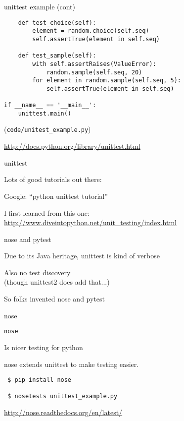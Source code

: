 \documentclass{beamer}
\begin{document}
\begin{frame}[fragile]{unittest example (cont)}

{\small
\begin{verbatim}
    def test_choice(self):
        element = random.choice(self.seq)
        self.assertTrue(element in self.seq)

    def test_sample(self):
        with self.assertRaises(ValueError):
            random.sample(self.seq, 20)
        for element in random.sample(self.seq, 5):
            self.assertTrue(element in self.seq)

if __name__ == '__main__':
    unittest.main()
\end{verbatim}
}

\vfill
(\verb|code/unitest_example.py|)

\vfill
\url{http://docs.python.org/library/unittest.html}

\end{frame} 

\begin{frame}[fragile]{unittest}

{\Large Lots of good tutorials out there:}

\vfill
{\Large Google: ``python unittest tutorial''}

\vfill
{\Large I first learned from this one:}\\[0.1in]
\url{http://www.diveintopython.net/unit_testing/index.html}

\end{frame} 

\begin{frame}[fragile]{nose and pytest}

{\Large Due to its Java heritage, unittest is kind of verbose}

\vfill
{\Large Also no test discovery}\\
\hspace{0.2in}(though unittest2 does add that...)

\vfill
{\Large So folks invented nose and pytest}

\end{frame} 

\begin{frame}[fragile]{nose}

{\LARGE \verb|nose|}

\vfill
{\Large \hspace{0.2in} Is nicer testing for python}

\vfill
{\Large \hspace{0.2in} nose extends unittest to make testing easier.}

\vfill
\begin{verbatim}
 $ pip install nose

 $ nosetests unittest_example.py 
\end{verbatim}

\vfill
\url{http://nose.readthedocs.org/en/latest/}
\end{frame} 
\end{document}
